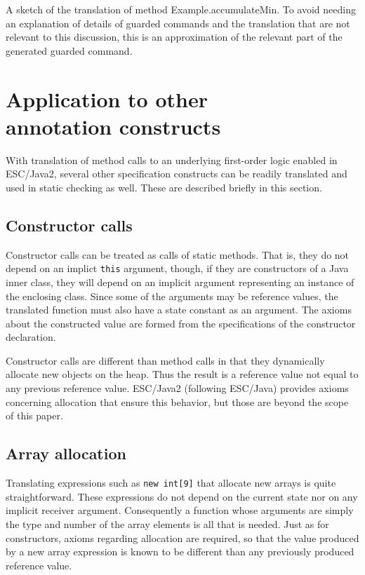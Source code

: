 \documentclass{sig-alternate}
\begin{document}
\begin{BFIGURE}

\caption{A sketch of the translation of method Example.accumulateMin.
To avoid needing an explanation of
 details of guarded commands and the translation that are not relevant to this discussion, this
is an approximation of the relevant part of the generated guarded command.}
\label{fig:TRA}
\end{BFIGURE}

\section{Application to other \\ annotation constructs}

With translation of method calls to an underlying first-order logic enabled in ESC/Java2, 
several other specification constructs can be readily translated and used in static checking as 
well.  These are described briefly in this section.
 
\subsection{Constructor calls}

Constructor calls can be treated as calls of static methods.  That is, they do not depend on an
implict \texttt{this} argument, though, if they are constructors of a Java inner class, they will depend 
on an implicit argument representing an instance of the enclosing class.  Since some of the 
arguments may be reference values, the translated function must also have a state constant
as an argument.  The axioms about the constructed value are formed from the specifications
of the constructor declaration.

Constructor calls are different than method calls 
in that they dynamically allocate new objects on the 
heap.  Thus the result is a reference value not equal to any previous reference value.  ESC/Java2
(following ESC/Java) provides axioms concerning allocation that ensure this behavior, but 
those are beyond the scope of this paper.

\subsection{Array allocation}

Translating expressions such as \texttt{new int[9]} that allocate new arrays is quite straightforward.
These expressions do not depend on the current state nor on any implicit receiver argument.
Consequently a function whose arguments are simply the type and number of the array 
elements is all that is needed.
Just as for constructors, axioms regarding allocation are required, 
so that the value produced by a new array
expression is known to be different than any previously produced reference value.
\end{document}

